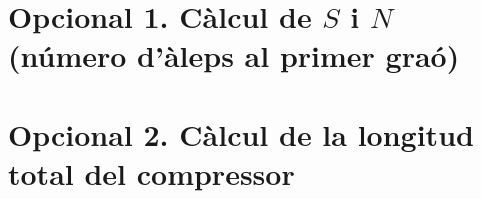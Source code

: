 \section{Opcional 1. Càlcul de $S$ i $N$ (número d'àleps al primer graó)}

\section{Opcional 2. Càlcul de la longitud total del compressor}